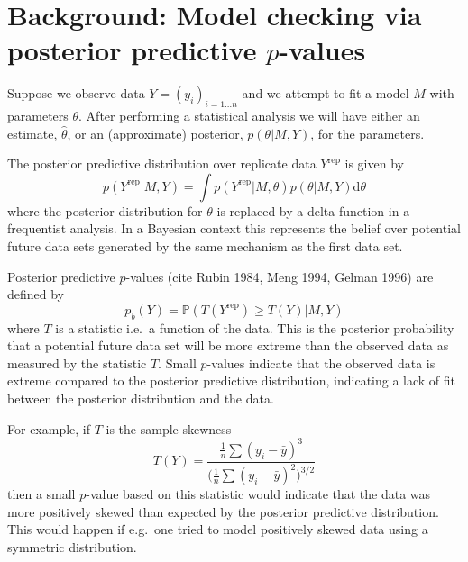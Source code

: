 \documentclass{article}
\def\ie{i.e.\ }
\def\eg{e.g.\ }
\begin{document}
\section{Background: Model checking via posterior predictive $p$-values}

Suppose we observe data $Y = (y_i)_{i=1\ldots n}$ and we attempt to fit a model $M$ with parameters $\theta$.
After performing a statistical analysis we will have either an estimate, $\hat\theta$, or an (approximate) posterior, $p(\theta|M,Y)$, for the parameters.

The posterior predictive distribution over replicate data $Y^\textrm{rep}$ is given by
\begin{equation}
p(Y^\textrm{rep}|M,Y) = \int p(Y^\textrm{rep}|M,\theta)p(\theta|M,Y)\mathrm{d}\theta
\end{equation}
where the posterior distribution for $\theta$ is replaced by a delta function in a frequentist analysis.
In a Bayesian context this represents the belief over potential future data sets generated by the same mechanism as the first data set.

Posterior predictive $p$-values (cite Rubin 1984, Meng 1994, Gelman 1996) are defined by
\begin{equation}
p_b(Y) = \mathbb{P}(T(Y^\textrm{rep})\geq T(Y)|M,Y)
\end{equation}
where $T$ is a statistic \ie a function of the data.
This is the posterior probability that a potential future data set will be more extreme than the observed data as measured by the statistic $T$.
Small $p$-values indicate that the observed data is extreme compared to the posterior predictive distribution, indicating a lack of fit between the posterior distribution and the data.


For example, if $T$ is the sample skewness
\begin{equation}
T(Y) = \frac{\frac{1}{n}\sum (y_i-\bar y)^3}{\big(\frac{1}{n}\sum (y_i- \bar y)^2\big)^{3/2}}
\end{equation}
then a small $p$-value based on this statistic would indicate that the data was more positively skewed than expected by the posterior predictive distribution.
This would happen if \eg one tried to model positively skewed data using a symmetric distribution.
\end{document}
